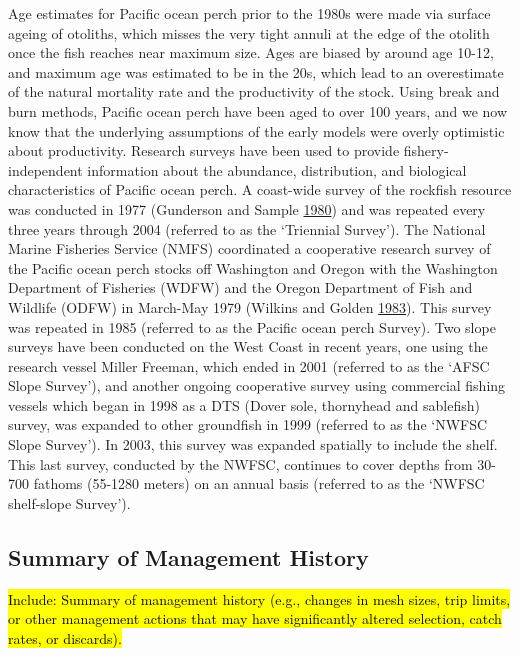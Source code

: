 \documentclass[12pt,]{article}
\begin{document}
Age estimates for Pacific ocean perch prior to the 1980s were made via
surface ageing of otoliths, which misses the very tight annuli at the
edge of the otolith once the fish reaches near maximum size. Ages are
biased by around age 10-12, and maximum age was estimated to be in the
20s, which lead to an overestimate of the natural mortality rate and the
productivity of the stock. Using break and burn methods, Pacific ocean
perch have been aged to over 100 years, and we now know that the
underlying assumptions of the early models were overly optimistic about
productivity. Research surveys have been used to provide
fishery-independent information about the abundance, distribution, and
biological characteristics of Pacific ocean perch. A coast-wide survey
of the rockfish resource was conducted in 1977 (Gunderson and Sample
\protect\hyperlink{ref-gunderson_distribution_1980}{1980}) and was
repeated every three years through 2004 (referred to as the `Triennial
Survey'). The National Marine Fisheries Service (NMFS) coordinated a
cooperative research survey of the Pacific ocean perch stocks off
Washington and Oregon with the Washington Department of Fisheries (WDFW)
and the Oregon Department of Fish and Wildlife (ODFW) in March-May 1979
(Wilkins and Golden
\protect\hyperlink{ref-wilkins_condition_1983}{1983}). This survey was
repeated in 1985 (referred to as the Pacific ocean perch Survey). Two
slope surveys have been conducted on the West Coast in recent years, one
using the research vessel Miller Freeman, which ended in 2001 (referred
to as the `AFSC Slope Survey'), and another ongoing cooperative survey
using commercial fishing vessels which began in 1998 as a DTS (Dover
sole, thornyhead and sablefish) survey, was expanded to other groundfish
in 1999 (referred to as the `NWFSC Slope Survey'). In 2003, this survey
was expanded spatially to include the shelf. This last survey, conducted
by the NWFSC, continues to cover depths from 30-700 fathoms (55-1280
meters) on an annual basis (referred to as the `NWFSC shelf-slope
Survey').

\subsection{Summary of Management
History}\label{summary-of-management-history}

\hl{Include: Summary of management history (e.g., changes in mesh sizes, trip 
                                            limits, or other management actions that may have significantly altered selection, 
                                            catch rates, or discards).}
\end{document}
